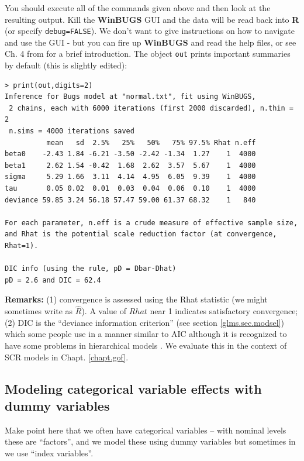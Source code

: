 You should execute all of the commands given above and then look at
the resulting output. Kill the {\bf WinBUGS} GUI and the data will be
read back into {\bf R} (or specify \mbox{\tt debug=FALSE}).  We don't
want to give instructions on how to navigate and use the GUI - but you
can fire up {\bf WinBUGS} and read the help files, or see Ch. 4 from
\citet{kery:2010} for a brief introduction.
The object \mbox{\tt out} prints important
summaries by default (this is slightly edited):

{\small
\begin{verbatim}
> print(out,digits=2)
Inference for Bugs model at "normal.txt", fit using WinBUGS,
 2 chains, each with 6000 iterations (first 2000 discarded), n.thin = 2
 n.sims = 4000 iterations saved
          mean   sd  2.5%   25%   50%   75% 97.5% Rhat n.eff
beta0    -2.43 1.84 -6.21 -3.50 -2.42 -1.34  1.27    1  4000
beta1     2.62 1.54 -0.42  1.68  2.62  3.57  5.67    1  4000
sigma     5.29 1.66  3.11  4.14  4.95  6.05  9.39    1  4000
tau       0.05 0.02  0.01  0.03  0.04  0.06  0.10    1  4000
deviance 59.85 3.24 56.18 57.47 59.00 61.37 68.32    1   840

For each parameter, n.eff is a crude measure of effective sample size,
and Rhat is the potential scale reduction factor (at convergence, Rhat=1).

DIC info (using the rule, pD = Dbar-Dhat)
pD = 2.6 and DIC = 62.4
\end{verbatim}
}

{\bf Remarks:} (1) convergence is assessed using the Rhat 
statistic (we might sometimes write as $\hat{R}$). A value of $Rhat$ near 1
indicates satisfactory convergence; (2) DIC is the
``deviance information criterion'' \citep{spiegelhalter_etal:2002}
(see section \ref{glms.sec.modsel})
 which
some people use in a manner similar to AIC although it is recognized
to have some problems in hierarchical models \citep{millar:2009}. We
evaluate this in the context of SCR models in Chapt. \ref{chapt.gof}.

\subsection{Modeling categorical variable effects with dummy
  variables}
\label{glms.sec.dummy}

Make point here that we often have categorical variables -- with
nominal levels these are ``factors'', and we model these using dummy
variables but sometimes in \bugs we use ``index variables''.




